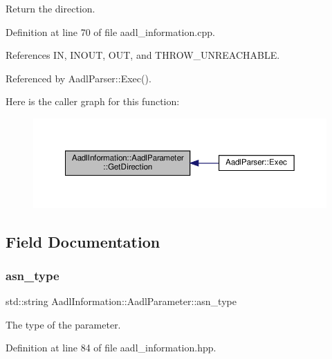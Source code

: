 Return the direction. 



Definition at line 70 of file aadl\+\_\+information.\+cpp.



References IN, I\+N\+O\+UT, O\+UT, and T\+H\+R\+O\+W\+\_\+\+U\+N\+R\+E\+A\+C\+H\+A\+B\+LE.



Referenced by Aadl\+Parser\+::\+Exec().

Here is the caller graph for this function\+:
\nopagebreak
\begin{figure}[H]
\begin{center}
\leavevmode
\includegraphics[width=350pt]{dc/d60/structAadlInformation_1_1AadlParameter_aa2e43e8d58fd796e2c9573738db5a41b_icgraph}
\end{center}
\end{figure}


\subsection{Field Documentation}
\mbox{\label{structAadlInformation_1_1AadlParameter_a9374191ab44514ad5a5b5ae8cd4f8e94}} 
\subsubsection{\texorpdfstring{asn\+\_\+type}{asn\_type}}
{\footnotesize\ttfamily std\+::string Aadl\+Information\+::\+Aadl\+Parameter\+::asn\+\_\+type}



The type of the parameter. 



Definition at line 84 of file aadl\+\_\+information.\+hpp.



